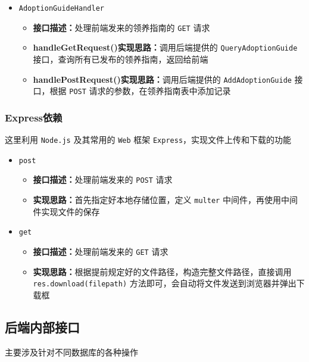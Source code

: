 \documentclass[12pt,a4paper,UTF8]{article}
\begin{document}
\begin{itemize}
  \item \verb|AdoptionGuideHandler|
  \begin{itemize}
  \item \textbf{接口描述：}处理前端发来的领养指南的 \verb|GET| 请求
  \item \textbf{handleGetRequest()实现思路：}调用后端提供的 \verb|QueryAdoptionGuide| 接口，查询所有已发布的领养指南，返回给前端
  \item \textbf{handlePostRequest()实现思路：}调用后端提供的 \verb|AddAdoptionGuide| 接口，根据 \verb|POST| 请求的参数，在领养指南表中添加记录
  \end{itemize}

\end{itemize}

\subsubsection{Express依赖}

这里利用 \verb|Node.js| 及其常用的 \verb|Web| 框架 \verb|Express|，实现文件上传和下载的功能

\begin{itemize}

  \item \verb|post|
  \begin{itemize}
  \item \textbf{接口描述：}处理前端发来的 \verb|POST| 请求
  \item \textbf{实现思路：}首先指定好本地存储位置，定义 \verb|multer| 中间件，再使用中间件实现文件的保存
  \end{itemize}

  \item \verb|get|
  \begin{itemize}
  \item \textbf{接口描述：}处理前端发来的 \verb|GET| 请求
  \item \textbf{实现思路：}根据提前规定好的文件路径，构造完整文件路径，直接调用 \verb|res.download(filepath)| 方法即可，会自动将文件发送到浏览器并弹出下载框
  \end{itemize}

\end{itemize}

\subsection{后端内部接口}

主要涉及针对不同数据库的各种操作
\end{document}
